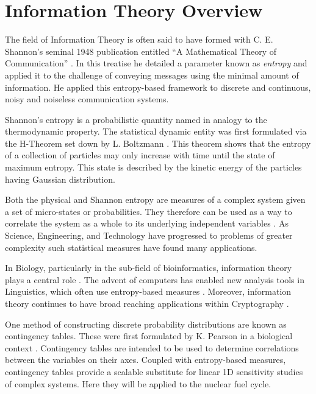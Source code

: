 \documentclass[a4paper, 12pt]{article}
\begin{document}
\section{Information Theory Overview}
\label{sec:it-overview}

The field of Information Theory is often said to have formed with C. E. Shannon's seminal 1948 publication 
entitled ``A Mathematical Theory of Communication'' \cite{Shannon1948}.  In this treatise he detailed a parameter 
known as \emph{entropy} and applied it to the challenge of conveying messages using the minimal 
amount of information.  He applied this entropy-based framework to discrete and continuous, noisy and noiseless 
communication systems.

Shannon's entropy is a probabilistic quantity named in analogy to the thermodynamic property.
The statistical dynamic entity was first formulated via the H-Theorem set down by L. Boltzmann 
\cite{Boltzmann1872}.  This theorem shows that the entropy of a collection of particles 
may only increase with time until the state of maximum entropy.   This state is described by the
kinetic energy of the particles having Gaussian distribution.  

Both the physical and Shannon entropy are measures of a complex system given a set of 
micro-states or probabilities.  They therefore can be used as a way to correlate the system 
as a whole to its underlying independent variables \cite{Watanabe1960}.  As Science, Engineering, 
and Technology have progressed to problems of greater complexity such statistical measures
have found many applications.

In Biology, particularly in the sub-field of bioinformatics, information theory plays a 
central role \cite{Rashevsky1955, Yockey2011}.  The advent of computers has enabled new 
analysis tools in Linguistics, which often use entropy-based measures \cite{Manning1999}. 
Moreover, information theory continues to have broad reaching applications within Cryptography
\cite{Ahlswede1993}.

One method of constructing discrete probability distributions are known as contingency tables.  
These were first formulated by K. Pearson in a biological context 
\cite{Pearson1904}.  Contingency tables are intended to be used to determine correlations 
between the variables on their axes.  Coupled with entropy-based measures, contingency 
tables provide a scalable substitute for linear 1D sensitivity studies of complex
systems.  Here they will be applied to the nuclear fuel cycle.
\end{document}
